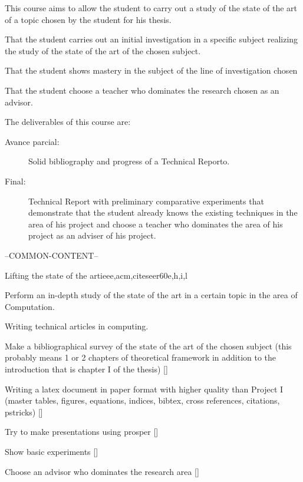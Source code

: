 \begin{syllabus}


\begin{justification}
This course aims to allow the student to carry out a study of the state of the art of a topic chosen by the student for his thesis.
\end{justification}

\begin{goals}
\item That the student carries out an initial investigation in a specific subject realizing the study of the state of the art of the chosen subject.
\item That the student shows mastery in the subject of the line of investigation chosen
\item That the student choose a teacher who dominates the research chosen as an advisor. 
\item The deliverables of this course are:
	\begin{description}
		\item [Avance parcial:] Solid bibliography and progress of a Technical Reporto.
		\item [Final:] Technical Report with preliminary comparative experiments that demonstrate that the student already knows the existing techniques in the area of his project and choose a teacher who dominates the area of his project as an adviser of his project.
	\end{description}
\end{goals}

--COMMON-CONTENT--

\begin{unit}{Lifting the state of the art}{}{ieee,acm,citeseer}{60}{e,h,i,l}
  \begin{topics}
      \item Perform an in-depth study of the state of the art in a certain topic in the area of Computation.
      \item Writing technical articles in computing.
  \end{topics}
  \begin{learningoutcomes}
      \item Make a bibliographical survey of the state of the art of the chosen subject (this probably means 1 or 2 chapters of theoretical framework in addition to the introduction that is chapter I of the thesis) [\Usage]
      \item Writing a latex document in paper format with higher quality than Project I (master tables, figures, equations, indices, bibtex, cross references, citations, pstricks) [\Usage]
      \item Try to make presentations using prosper [\Usage]
      \item Show basic experiments [\Usage]
      \item Choose an advisor who dominates the research area [\Usage]
   \end{learningoutcomes}
\end{unit}


\end{syllabus}
